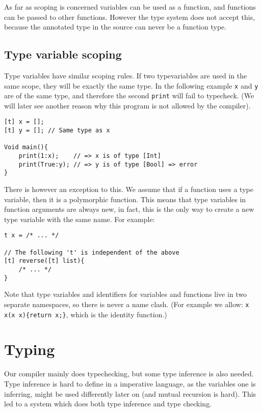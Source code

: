 \documentclass[14pt]{amsart}
\begin{document}
As far as scoping is concerned variables can be used as a function, and functions can be passed to other functions. However the type system does not accept this, because the annotated type in the source can never be a function type.

\subsection{Type variable scoping}
Type variables have similar scoping rules. If two typevariables are used in the same scope, they will be exactly the same type. In the following example \texttt{x} and \texttt{y} are of the same type, and therefore the second \texttt{print} will fail to typecheck. (We will later see another reason why this program is not allowed by the compiler).

\begin{lstlisting}
[t] x = [];
[t] y = []; // Same type as x

Void main(){
	print(1:x);    // => x is of type [Int]
	print(True:y); // => y is of type [Bool] => error
}
\end{lstlisting}

There is however an exception to this. We assume that if a function uses a type variable, then it is a polymorphic function. This means that type variables in function arguments are always new, in fact, this is the only way to create a new type variable with the same name. For example:

\begin{lstlisting}
t x = /* ... */

// The following 't' is independent of the above
[t] reverse([t] list){
	/* ... */
}
\end{lstlisting}

Note that type variables and identifiers for variables and functions live in two separate namespaces, so there is never a name clash. (For example we allow: \texttt{x x(x x)\{return x;\}}, which is the identity function.)

\section{Typing}

Our compiler mainly does typechecking, but some type inference is also needed. Type inference is hard to define in a imperative language, as the variables one is inferring, might be used differently later on (and mutual recursion is hard). This led to a system which does both type inference and type checking.
\end{document}
